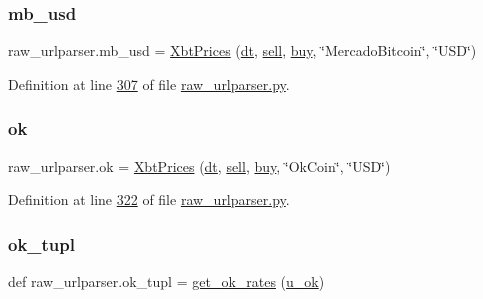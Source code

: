 \subsubsection{\texorpdfstring{mb\+\_\+usd}{mb\_usd}}
{\footnotesize\ttfamily raw\+\_\+urlparser.\+mb\+\_\+usd = \hyperlink{classraw__urlparser_1_1_xbt_prices}{Xbt\+Prices} (\hyperlink{namespaceraw__urlparser_acbaf2eef75f4aa43e1f6659c0fd34836}{dt}, \hyperlink{namespaceraw__urlparser_a9f1ba2a5cd520bb41ac4bee751047679}{sell}, \hyperlink{namespaceraw__urlparser_a2b9c66c8d5157cd95ecb738719c8a873}{buy}, \char`\"{}Mercado\+Bitcoin\char`\"{}, \char`\"{}U\+SD\char`\"{})}



Definition at line \hyperlink{raw__urlparser_8py_source_l00307}{307} of file \hyperlink{raw__urlparser_8py_source}{raw\+\_\+urlparser.\+py}.

\mbox{\label{namespaceraw__urlparser_aa0dcadbc04ec5d09f7a2dabb865000c8}} 
\subsubsection{\texorpdfstring{ok}{ok}}
{\footnotesize\ttfamily raw\+\_\+urlparser.\+ok = \hyperlink{classraw__urlparser_1_1_xbt_prices}{Xbt\+Prices} (\hyperlink{namespaceraw__urlparser_acbaf2eef75f4aa43e1f6659c0fd34836}{dt}, \hyperlink{namespaceraw__urlparser_a9f1ba2a5cd520bb41ac4bee751047679}{sell}, \hyperlink{namespaceraw__urlparser_a2b9c66c8d5157cd95ecb738719c8a873}{buy}, \char`\"{}Ok\+Coin\char`\"{}, \char`\"{}U\+SD\char`\"{})}



Definition at line \hyperlink{raw__urlparser_8py_source_l00322}{322} of file \hyperlink{raw__urlparser_8py_source}{raw\+\_\+urlparser.\+py}.

\mbox{\label{namespaceraw__urlparser_a470f476a37f64adb24b58db300e57117}} 
\subsubsection{\texorpdfstring{ok\+\_\+tupl}{ok\_tupl}}
{\footnotesize\ttfamily def raw\+\_\+urlparser.\+ok\+\_\+tupl = \hyperlink{namespaceraw__urlparser_aaf342c097e3df48d46b7296e8177d737}{get\+\_\+ok\+\_\+rates} (\hyperlink{namespaceraw__urlparser_a22c1a17803a88426d38d70ad6d4290d2}{u\+\_\+ok})}




